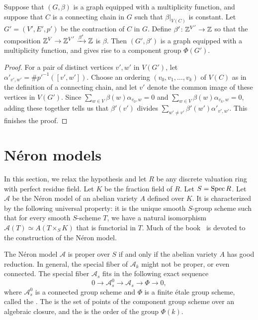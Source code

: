 \begin{lemma}
 Suppose that $(G,\beta)$ is a graph equipped with a multiplicity function, and suppose that $C$ is a connecting chain in $G$ such that $\beta|_{V(C)}$ is constant. Let $G' = (V',E',p')$ be the contraction of $C$ in $G$. Define $\beta' \colon \mathbb Z^{V'} \rightarrow \mathbb Z$ so that the composition $\mathbb Z^V \rightarrow \mathbb Z^{V'} \xrightarrow{\beta'} \mathbb Z$ is $\beta$. Then $(G',\beta')$ is a graph equipped with a multiplicity function, and gives rise to a component group $\Phi(G')$.
\end{lemma}
\begin{proof}
 For a pair of distinct vertices $v',w'$ in $V(G')$, let $\alpha'_{v',w'} = \# p'^{-1}([v',w'])$. Choose an ordering $(v_0,v_1,\ldots,v_k)$ of $V(C)$ as in the definition of a connecting chain, and let $v'$ denote the common image of these vertices in $V(G')$. Since $\sum_{w \in V} \beta(w) \alpha_{v_0,w} = 0$ and $\sum_{w \in V} \beta(w) \alpha_{v_k,w} = 0$, adding these together tells us that $\beta'(v')$ divides $\sum_{w' \neq v'} \beta'(w') \alpha'_{v',w'}$. This finishes the proof.
\end{proof}

\section{N\'{e}ron models}\label{defneron}
In this section, we relax the hypothesis and let $R$ be any discrete valuation ring with perfect residue field. Let $K$ be the fraction field of $R$. Let $S = \operatorname{Spec} R$. Let $\mathcal{A}$ be the N\'{e}ron model of an abelian variety $A$ defined over $K$. It is characterized by the following universal property: it is the unique smooth $S$-group scheme such that for every smooth $S$-scheme $T$, we have a natural isomorphism $\mathcal{A}(T) \simeq A(T \times_S K)$ that is functorial in $T$. Much of the book~\cite{blr} is devoted to the construction of the N\'{e}ron model. 

The N\'{e}ron model $\mathcal{A}$ is proper over $S$ if and only if the abelian variety $A$ has good reduction. In general, the special fiber of $\mathcal{A}_k$ might not be proper, or even connected. The special fiber $\mathcal{A}_s$ fits in the following exact sequence 
\[ 0 \rightarrow \mathcal{A}_s^0 \rightarrow \mathcal{A}_s \rightarrow \Phi \rightarrow 0,  \]
where $\mathcal{A}_s^0$ is a connected group scheme and $\Phi$ is a finite \'{e}tale group scheme, called the {}. The {} is the set of points of the component group scheme over an algebraic closure, and the {} is the order of the group $\Phi(k)$. 

